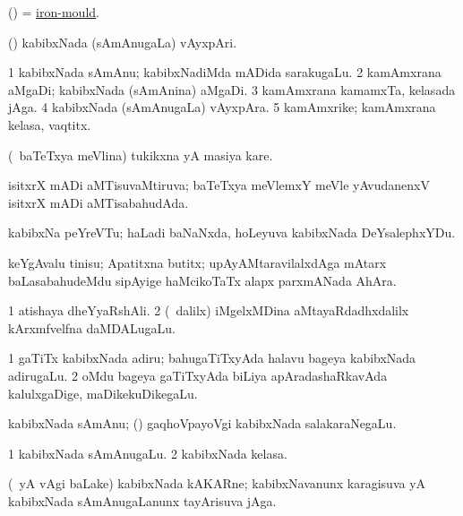 \bentry
{}
\gl{\nA}
\bmng
(\ame) =  \hyperlink{iron-mould}{iron-mould}. 
\emng
\eentry

\bentry
{}
\gl{\nA}
\bmng
(\birx) kabibxNada (sAmAnugaLa) vAyxpAri. 
\emng
\eentry

\bentry
{}
\gl{\nA}
\bmng
\bnum
\num{1} kabibxNada sAmAnu; kabibxNadiMda mADida sarakugaLu. 
\num{2} kamAmxrana aMgaDi; kabibxNada (sAmAnina) aMgaDi. 
\num{3} kamAmxrana kamamxTa, kelasada jAga. 
\num{4} kabibxNada (sAmAnugaLa) vAyxpAra. 
\num{5} kamAmxrike; kamAmxrana kelasa, vaqtitx. 
\enum
\emng
\eentry

\bentry
{}
\gl{\nA}
\bmng
(\kanmu\ baTeTxya meVlina) tukikxna yA masiya kare. 
\emng
\eentry

\bentry
{}
\gl{\gu}
\bmng
isitxrX mADi aMTisuvaMtiruva; baTeTxya meVlemxY meVle yAvudanenxV isitxrX mADi aMTisabahudAda. 
\emng
\eentry

\bentry
{}
\gl{\nA}
\bmng
kabibxNa peYreVTu; haLadi baNaNxda, hoLeyuva kabibxNada DeYsalephxYDu. 
\emng
\eentry

\bentry
{}
\gl{\nA}
\bmng
keYgAvalu tinisu; Apatitxna butitx; upAyAMtaravilalxdAga mAtarx baLasabahudeMdu sipAyige haMcikoTaTx alapx parxmANada AhAra. 
\emng
\eentry

\bentry
{}
\gl{\nA}
\bmng
\bnum
\num{1} atishaya dheYyaRshAli. 
\num{2} (\kanmu\ \bava dalilx) iMgelxMDina aMtayaRdadhxdalilx kArxmfvelfna daMDALugaLu. 
\enum
\emng
\eentry

\bentry
{}
\gl{\nA}
\bmng
\bnum
\num{1} gaTiTx kabibxNada adiru; bahugaTiTxyAda halavu bageya kabibxNada adirugaLu. 
\num{2} oMdu bageya gaTiTxyAda biLiya apAradashaRkavAda kalulxgaDige, maDikekuDikegaLu. 
\enum
\emng
\eentry

\bentry
{}
\gl{\nA}
\bmng
kabibxNada sAmAnu; (\kanmu) gaqhoVpayoVgi kabibxNada salakaraNegaLu. 
\emng
\eentry

\bentry
{}
\gl{\nA}
\bmng
\bnum
\num{1} kabibxNada sAmAnugaLu. 
\num{2} kabibxNada kelasa. 
\enum
\emng
\eentry

\bentry
{}
\gl{\nA}
\bmng
(\Eva\ yA \bava vAgi baLake) kabibxNada kAKARne; kabibxNavanunx karagisuva yA kabibxNada sAmAnugaLanunx tayArisuva jAga. 
\emng
\eentry

